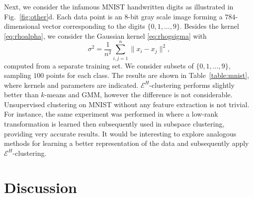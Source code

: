 \documentclass[aps,preprint,nofootinbib,floatfix]{revtex4-1}
\begin{document}
Next, we consider 
the infamous MNIST handwritten digits
as illustrated in Fig.~\ref{fig:other}d.
Each data point is an $8$-bit gray scale
image forming a $784$-dimensional vector 
corresponding to the digits $\{0,1,\dotsc,9 \}$.
Besides the kernel \eqref{eq:rhoalpha}, we
consider the Gaussian kernel \eqref{eq:rhogsigma} with 
\begin{equation}
\label{eq:sigma}
\sigma^2 = \dfrac{1}{n^2} \sum_{i,j=1}^n \| x_i - x_j \|^2 ,
\end{equation}
computed from a separate
training set.
We consider subsets of $\{0,1,\dotsc,9 \}$, 
sampling $100$ points 
for each class. 
The results are shown in Table~\ref{table:mnist}, where kernels
and parameters are indicated.
$\mathcal{E}^H$-clustering performs slightly better than $k$-means
and GMM, however the difference is not considerable.
Unsupervised clustering on MNIST without any feature extraction
is not trivial. For instance,
the same experiment was performed in \cite{Sapiro} where a low-rank
transformation is learned then subsequently used in subspace clustering,
providing very accurate results. It would be interesting to 
explore analogous methods
for learning a better representation of the data and subsequently apply
$\mathcal{E}^H$-clustering.


\section{Discussion}
\label{sec:conclusion}
\end{document}
